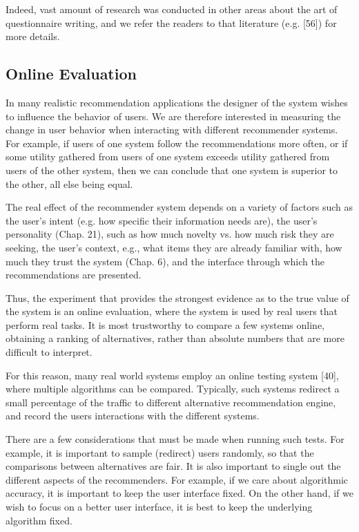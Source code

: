 Indeed, vast amount of research was conducted in other areas about the art of questionnaire writing, and we refer the readers to that literature (e.g. [56]) for more details.

\subsection{Online Evaluation}

In many realistic recommendation applications the designer of the system wishes to influence the behavior of users. We are therefore interested in measuring the change in user behavior when interacting with different recommender systems. For example, if users of one system follow the recommendations more often, or if some utility gathered from users of one system exceeds utility gathered from users of the other system, then we can conclude that one system is superior to the other, all else being equal.

The real effect of the recommender system depends on a variety of factors such as the user’s intent (e.g. how specific their information needs are), the user’s personality (Chap. 21), such as how much novelty vs. how much risk they are seeking, the user’s context, e.g., what items they are already familiar with, how much they trust the system (Chap. 6), and the interface through which the recommendations are presented.

Thus, the experiment that provides the strongest evidence as to the true value of the system is an online evaluation, where the system is used by real users that perform real tasks. It is most trustworthy to compare a few systems online, obtaining a ranking of alternatives, rather than absolute numbers that are more difficult to interpret.

For this reason, many real world systems employ an online testing system [40], where multiple algorithms can be compared. Typically, such systems redirect a small percentage of the traffic to different alternative recommendation engine, and record the users interactions with the different systems.

There are a few considerations that must be made when running such tests. For example, it is important to sample (redirect) users randomly, so that the comparisons between alternatives are fair. It is also important to single out the different aspects of the recommenders. For example, if we care about algorithmic accuracy, it is important to keep the user interface fixed. On the other hand, if we wish to focus on a better user interface, it is best to keep the underlying algorithm fixed.

